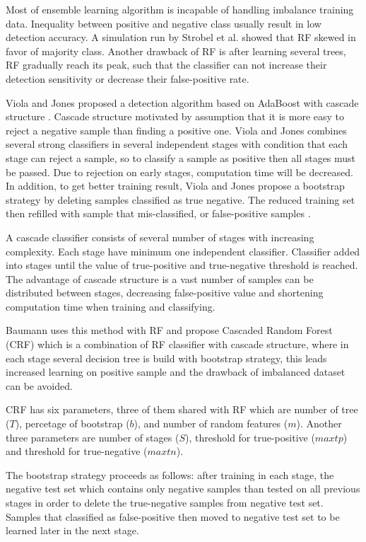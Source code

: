 Most of ensemble learning algorithm is incapable of handling imbalance training
data.
Inequality between positive and negative class usually result in low
detection accuracy.
A simulation run by Strobel et al. \cite{strobl2007bias} showed that RF skewed
in favor of majority class.
Another drawback of RF is after learning several trees, RF gradually reach its
peak, such that the classifier can not increase their detection sensitivity or
decrease their false-positive rate.

Viola and Jones proposed a detection algorithm based on AdaBoost with
cascade structure \cite{viola2004robust}.
Cascade structure motivated by assumption that it is more easy to reject a
negative sample than finding a positive one.
Viola and Jones combines several strong classifiers in several independent
stages with condition that each stage can reject a sample, so to classify a
sample as positive then all stages must be passed.
Due to rejection on early stages, computation time will be decreased.
In addition, to get better training result, Viola and Jones propose a bootstrap
strategy by deleting samples classified as true negative.
The reduced training set then refilled with sample that mis-classified, or
false-positive samples
\cite{viola2004robust}.

A cascade classifier consists of several number of stages with increasing
complexity.
Each stage have minimum one independent classifier.
Classifier added into stages until the value of true-positive and true-negative
threshold is reached.
The advantage of cascade structure is a vast number of samples can be
distributed between stages, decreasing false-positive value and shortening
computation time when training and classifying.

Baumann uses this method with RF and propose Cascaded Random Forest (CRF) which
is a combination of RF classifier with cascade structure, where in each stage
several decision tree is build with bootstrap strategy, this leads increased
learning on positive sample and the drawback of imbalanced dataset can be
avoided.
\cite{baumann2013cascaded}

CRF has six parameters, three of them shared with RF which are number of tree
($T$), percetage of bootstrap ($b$), and number of random features ($m$).
Another three parameters are number of stages ($S$), threshold
for true-positive ($maxtp$) and threshold for true-negative ($maxtn$).

The bootstrap strategy proceeds as follows: after training in each stage, the
negative test set which contains only negative samples than tested on all
previous stages in order to delete the true-negative samples from
negative test set.
Samples that classified as false-positive then moved to negative test set to be
learned later in the next stage.

